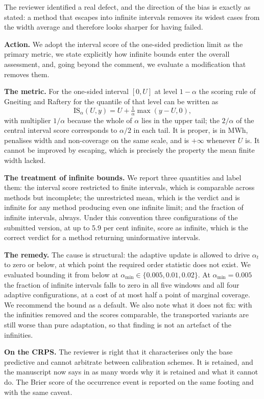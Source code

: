 \documentclass[11pt,a4paper]{article}
\newcommand{\action}[1]{\textbf{Action.} #1}
\begin{document}
The reviewer identified a real defect, and the direction of the bias is exactly as stated: a method that escapes into infinite intervals removes its widest cases from the width average and therefore looks sharper for having failed.

\action{We adopt the interval score of the one-sided prediction limit as the primary metric, we state explicitly how infinite bounds enter the overall assessment, and, going beyond the comment, we evaluate a modification that removes them.}

\textbf{The metric.} For the one-sided interval $[0,U]$ at level $1-\alpha$ the scoring rule of Gneiting and Raftery for the quantile of that level can be written as
\[
\mathrm{IS}_\alpha(U,y)=U+\tfrac{1}{\alpha}\max(y-U,0),
\]
with multiplier $1/\alpha$ because the whole of $\alpha$ lies in the upper tail; the $2/\alpha$ of the central interval score corresponds to $\alpha/2$ in each tail. It is proper, is in MWh, penalises width and non-coverage on the same scale, and is $+\infty$ whenever $U$ is. It cannot be improved by escaping, which is precisely the property the mean finite width lacked.

\textbf{The treatment of infinite bounds.} We report three quantities and label them: the interval score restricted to finite intervals, which is comparable across methods but incomplete; the unrestricted mean, which is the verdict and is infinite for any method producing even one infinite limit; and the fraction of infinite intervals, always. Under this convention three configurations of the submitted version, at up to 5.9 per cent infinite, score as infinite, which is the correct verdict for a method returning uninformative intervals.

\textbf{The remedy.} The cause is structural: the adaptive update is allowed to drive $\alpha_t$ to zero or below, at which point the required order statistic does not exist. We evaluated bounding it from below at $\alpha_{\min}\in\{0.005,0.01,0.02\}$. At $\alpha_{\min}=0.005$ the fraction of infinite intervals falls to zero in all five windows and all four adaptive configurations, at a cost of at most half a point of marginal coverage. We recommend the bound as a default. We also note what it does not fix: with the infinities removed and the scores comparable, the transported variants are still worse than pure adaptation, so that finding is not an artefact of the infinities.

\textbf{On the CRPS.} The reviewer is right that it characterises only the base predictive and cannot arbitrate between calibration schemes. It is retained, and the manuscript now says in as many words why it is retained and what it cannot do. The Brier score of the occurrence event is reported on the same footing and with the same caveat.
\end{document}
